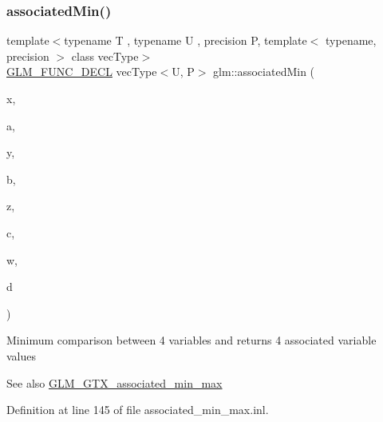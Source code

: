 \subsubsection{\texorpdfstring{associatedMin()}{associatedMin()}\hspace{0.1cm}{\footnotesize\ttfamily [10/10]}}
{\footnotesize\ttfamily template$<$typename T , typename U , precision P, template$<$ typename, precision $>$ class vec\+Type$>$ \\
\mbox{\hyperlink{setup_8hpp_ab2d052de21a70539923e9bcbf6e83a51}{G\+L\+M\+\_\+\+F\+U\+N\+C\+\_\+\+D\+E\+CL}} vec\+Type$<$U, P$>$ glm\+::associated\+Min (\begin{DoxyParamCaption}\item[{vec\+Type$<$ T, P $>$ const \&}]{x,  }\item[{U}]{a,  }\item[{vec\+Type$<$ T, P $>$ const \&}]{y,  }\item[{U}]{b,  }\item[{vec\+Type$<$ T, P $>$ const \&}]{z,  }\item[{U}]{c,  }\item[{vec\+Type$<$ T, P $>$ const \&}]{w,  }\item[{U}]{d }\end{DoxyParamCaption})}

Minimum comparison between 4 variables and returns 4 associated variable values \begin{DoxySeeAlso}{See also}
\mbox{\hyperlink{group__gtx__associated__min__max}{G\+L\+M\+\_\+\+G\+T\+X\+\_\+associated\+\_\+min\+\_\+max}} 
\end{DoxySeeAlso}


Definition at line 145 of file associated\+\_\+min\+\_\+max.\+inl.

